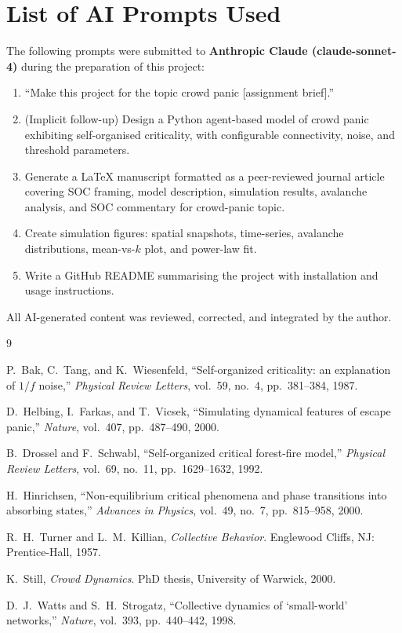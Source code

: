 \documentclass[12pt, a4paper]{article}
\begin{document}
\section*{List of AI Prompts Used}
\label{sec:prompts}

The following prompts were submitted to \textbf{Anthropic Claude (claude-sonnet-4)}
during the preparation of this project:

\begin{enumerate}
  \item ``Make this project for the topic crowd panic [assignment brief].''
  \item (Implicit follow-up) Design a Python agent-based model of crowd panic
        exhibiting self-organised criticality, with configurable connectivity,
        noise, and threshold parameters.
  \item Generate a LaTeX manuscript formatted as a peer-reviewed journal article
        covering SOC framing, model description, simulation results, avalanche
        analysis, and SOC commentary for crowd-panic topic.
  \item Create simulation figures: spatial snapshots, time-series, avalanche
        distributions, mean-vs-$k$ plot, and power-law fit.
  \item Write a GitHub README summarising the project with installation and usage
        instructions.
\end{enumerate}

All AI-generated content was reviewed, corrected, and integrated by the author.


\begin{thebibliography}{9}

P.\ Bak, C.\ Tang, and K.\ Wiesenfeld,
``Self-organized criticality: an explanation of $1/f$ noise,''
\textit{Physical Review Letters}, vol.\ 59, no.\ 4, pp.\ 381--384, 1987.

D.\ Helbing, I.\ Farkas, and T.\ Vicsek,
``Simulating dynamical features of escape panic,''
\textit{Nature}, vol.\ 407, pp.\ 487--490, 2000.

B.\ Drossel and F.\ Schwabl,
``Self-organized critical forest-fire model,''
\textit{Physical Review Letters}, vol.\ 69, no.\ 11, pp.\ 1629--1632, 1992.

H.\ Hinrichsen,
``Non-equilibrium critical phenomena and phase transitions into absorbing states,''
\textit{Advances in Physics}, vol.\ 49, no.\ 7, pp.\ 815--958, 2000.

R.\ H.\ Turner and L.\ M.\ Killian,
\textit{Collective Behavior}.
Englewood Cliffs, NJ: Prentice-Hall, 1957.

K.\ Still,
\textit{Crowd Dynamics}.
PhD thesis, University of Warwick, 2000.

D.\ J.\ Watts and S.\ H.\ Strogatz,
``Collective dynamics of `small-world' networks,''
\textit{Nature}, vol.\ 393, pp.\ 440--442, 1998.

\end{thebibliography}
\end{document}

